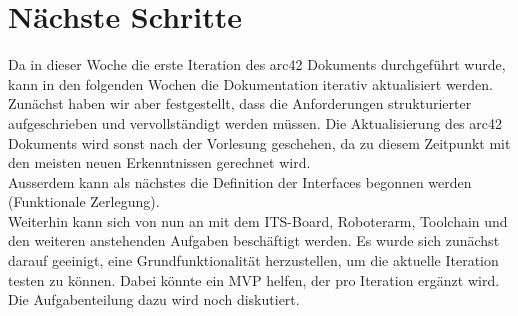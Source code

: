 \documentclass{article}
\begin{document}
\section{Nächste Schritte}
Da in dieser Woche die erste Iteration des arc42 Dokuments durchgeführt wurde, kann in den folgenden Wochen die Dokumentation iterativ aktualisiert werden. Zunächst haben wir aber festgestellt, dass die Anforderungen strukturierter aufgeschrieben und vervollständigt werden müssen. Die Aktualisierung des arc42 Dokuments wird sonst nach der Vorlesung geschehen, da zu diesem Zeitpunkt mit den meisten neuen Erkenntnissen gerechnet wird. \\
Ausserdem kann als nächstes die Definition der Interfaces begonnen werden (Funktionale Zerlegung). \\ 
Weiterhin kann sich von nun an mit dem ITS-Board, Roboterarm, Toolchain und den weiteren anstehenden Aufgaben beschäftigt werden. Es wurde sich zunächst darauf geeinigt, eine Grundfunktionalität herzustellen, um die aktuelle Iteration testen zu können. Dabei könnte ein MVP helfen, der pro Iteration ergänzt wird. Die Aufgabenteilung dazu wird noch diskutiert.
\end{document}

